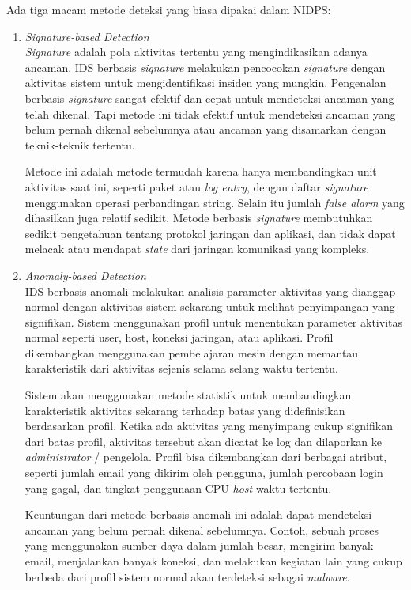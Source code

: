     Ada tiga macam metode deteksi yang biasa dipakai dalam NIDPS:
    \begin{enumerate}

      \item
      \emph{Signature-based Detection} \\
      \emph{Signature} adalah pola aktivitas tertentu yang mengindikasikan adanya ancaman. IDS berbasis \emph{signature} melakukan pencocokan \emph{signature} dengan aktivitas sistem untuk mengidentifikasi insiden yang mungkin. Pengenalan berbasis \emph{signature} sangat efektif dan cepat untuk mendeteksi ancaman yang telah dikenal. Tapi metode ini tidak efektif untuk mendeteksi ancaman yang belum pernah dikenal sebelumnya atau ancaman yang disamarkan dengan teknik-teknik tertentu.

      Metode ini adalah metode termudah karena hanya membandingkan unit aktivitas saat ini, seperti paket atau \emph{log entry}, dengan daftar \emph{signature} menggunakan operasi perbandingan string. Selain itu jumlah \emph{false alarm} yang dihasilkan juga relatif sedikit. Metode berbasis \emph{signature} membutuhkan sedikit pengetahuan tentang protokol jaringan dan aplikasi, dan tidak dapat melacak atau mendapat \emph{state} dari jaringan komunikasi yang kompleks.

      \item
      \emph{Anomaly-based Detection} \\
      IDS berbasis anomali melakukan analisis parameter aktivitas yang dianggap normal dengan aktivitas sistem sekarang untuk melihat penyimpangan yang signifikan. Sistem menggunakan profil untuk menentukan parameter aktivitas normal seperti user, host, koneksi jaringan, atau aplikasi. Profil dikembangkan menggunakan pembelajaran mesin dengan memantau karakteristik dari aktivitas sejenis selama selang waktu tertentu.

      Sistem akan menggunakan metode statistik untuk membandingkan karakteristik aktivitas sekarang terhadap batas yang didefinisikan berdasarkan profil. Ketika ada aktivitas yang menyimpang cukup signifikan dari batas profil, aktivitas tersebut akan dicatat ke log dan dilaporkan ke \emph{administrator} / pengelola. Profil bisa dikembangkan dari berbagai atribut, seperti jumlah email yang dikirim oleh pengguna, jumlah percobaan login yang gagal, dan tingkat penggunaan CPU \emph{host} waktu tertentu.

      Keuntungan dari metode berbasis anomali ini adalah dapat mendeteksi ancaman yang belum pernah dikenal sebelumnya. Contoh, sebuah proses yang menggunakan sumber daya dalam jumlah besar, mengirim banyak email, menjalankan banyak koneksi, dan melakukan kegiatan lain yang cukup berbeda dari profil sistem normal akan terdeteksi sebagai \emph{malware}.


\end{enumerate}
